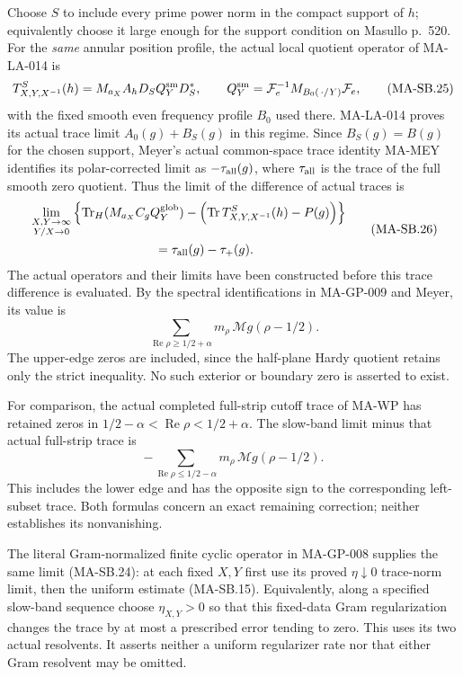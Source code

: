 Choose $S$ to include every prime power norm in
the compact support of $h$; equivalently choose
it large enough for the support condition on
Masullo p.~520.  For the \emph{same} annular
position profile, the actual local quotient
operator of MA-LA-014 is
\[
 T^S_{X,Y,X^{-1}}(h)
       =M_{a_X}A_hD_SQ_Y^{\rm sm}D_S^*,
 \qquad
 Q_Y^{\rm sm}=\mathcal F_e^{-1}
                   M_{B_0(\,\cdot/Y)}\mathcal F_e ,
 \tag{MA-SB.25}
\]
with the fixed smooth even frequency profile
$B_0$ used there.
MA-LA-014 proves its actual trace limit
$A_0(g)+B_S(g)$ in this regime.
Since $B_S(g)=B(g)$ for the chosen support,
Meyer's actual common-space trace identity
MA-MEY identifies its polar-corrected limit
as $-\tau_{\rm all}(g)$, where
$\tau_{\rm all}$ is the trace of the full
smooth zero quotient.
Thus the limit of the difference of actual
traces is
\[
 \begin{split}
 &\lim_{\substack{X,Y\to\infty\\Y/X\to0}}
 \left\{\operatorname{Tr}_H(M_{a_X}C_gQ_Y^{\rm glob})
      -\left(\operatorname{Tr}T^S_{X,Y,X^{-1}}(h)-P(g)\right)\right\}\\
 &\hspace{35mm}=\tau_{\rm all}(g)-\tau_+(g).
 \end{split}
 \tag{MA-SB.26}
\]
The actual operators and their limits have been
constructed before this trace difference is
evaluated.  By the spectral identifications in
MA-GP-009 and Meyer, its value is
\[
                \sum_{\operatorname{Re}\rho\ge1/2+\alpha}
                        m_\rho\,\mathcal Mg(\rho-1/2).
 \tag{MA-SB.27}
\]
The upper-edge zeros are included, since the
half-plane Hardy quotient retains only the
strict inequality.
No such exterior or boundary zero is asserted
to exist.

For comparison, the actual completed full-strip
cutoff trace of MA-WP has retained zeros in
$1/2-\alpha<\operatorname{Re}\rho<1/2+\alpha$.
The slow-band limit minus that actual full-strip
trace is
\[
             -\sum_{\operatorname{Re}\rho\le1/2-\alpha}
                       m_\rho\,\mathcal Mg(\rho-1/2).
 \tag{MA-SB.28}
\]
This includes the lower edge and has the opposite
sign to the corresponding left-subset trace.
Both formulas concern an exact remaining
correction; neither establishes its nonvanishing.

The literal Gram-normalized finite cyclic operator
in MA-GP-008 supplies the same limit (MA-SB.24):
at each fixed $X,Y$ first use its proved
$\eta\downarrow0$ trace-norm limit, then the
uniform estimate (MA-SB.15).
Equivalently, along a specified slow-band sequence
choose $\eta_{X,Y}>0$ so that this fixed-data
Gram regularization changes the trace by at
most a prescribed error tending to zero.
This uses its two actual resolvents.
It asserts neither a uniform regularizer rate
nor that either Gram resolvent may be omitted.

